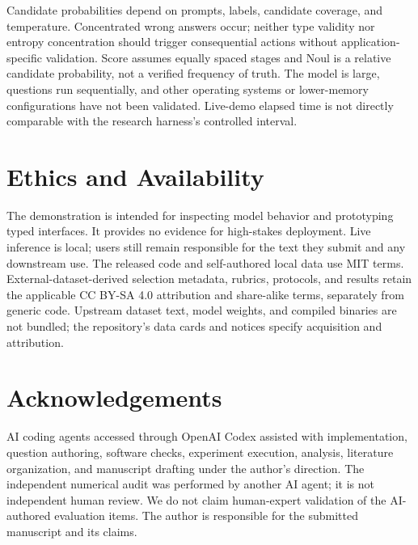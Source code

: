\documentclass[11pt]{article}
\begin{document}
Candidate probabilities depend on prompts, labels, candidate coverage, and temperature. Concentrated wrong answers occur; neither type validity nor entropy concentration should trigger consequential actions without application-specific validation. Score assumes equally spaced stages and Noul is a relative candidate probability, not a verified frequency of truth. The model is large, questions run sequentially, and other operating systems or lower-memory configurations have not been validated. Live-demo elapsed time is not directly comparable with the research harness's controlled interval.

\section*{Ethics and Availability}
The demonstration is intended for inspecting model behavior and prototyping typed interfaces. It provides no evidence for high-stakes deployment. Live inference is local; users still remain responsible for the text they submit and any downstream use. The released code and self-authored local data use MIT terms. External-dataset-derived selection metadata, rubrics, protocols, and results retain the applicable CC BY-SA 4.0 attribution and share-alike terms, separately from generic code. Upstream dataset text, model weights, and compiled binaries are not bundled; the repository's data cards and notices specify acquisition and attribution.

\section*{Acknowledgements}
AI coding agents accessed through OpenAI Codex assisted with implementation, question authoring, software checks, experiment execution, analysis, literature organization, and manuscript drafting under the author's direction. The independent numerical audit was performed by another AI agent; it is not independent human review. We do not claim human-expert validation of the AI-authored evaluation items. The author is responsible for the submitted manuscript and its claims.



\end{document}
